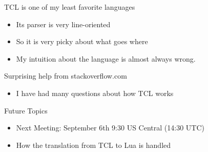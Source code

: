 \documentclass{beamer}
\begin{document}
\begin{frame}{TCL is one of my least favorite languages}
  \begin{itemize}
    \item Its parser is very line-oriented
    \item So it is very picky about what goes where
    \item My intuition about the language is almost always wrong.
  \end{itemize}
\end{frame}

\begin{frame}{Surprising help from stackoverflow.com}
  \begin{itemize}
    \item I have had many questions about how TCL works
  \end{itemize}
\end{frame}

\begin{frame}{Future Topics}
  \begin{itemize}
    \item Next Meeting: September 6th 9:30 US Central (14:30 UTC)
    \item How the translation from TCL to Lua is handled
  \end{itemize}
\end{frame}
\end{document}
